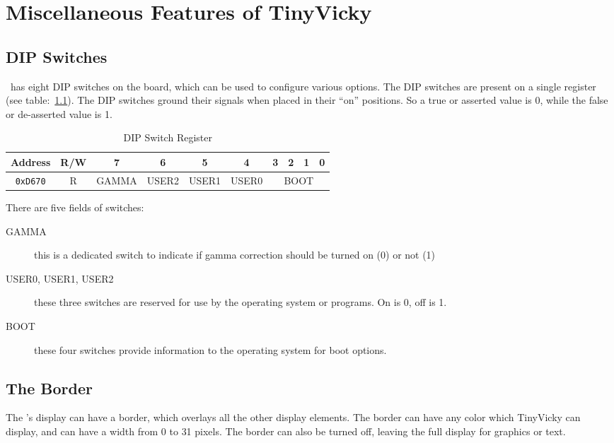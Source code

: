 \chapter{Miscellaneous Features of TinyVicky}

\section*{DIP Switches}

\jr\ has eight DIP switches on the board, which can be used to configure various options. The DIP switches are present on a single register (see table:~\ref{tab:dip_reg}). The DIP switches ground their signals when placed in their ``on'' positions. So a true or asserted value is 0, while the false or de-asserted value is 1.

\begin{table}[ht]
    \begin{center}
        \begin{tabular}{|c|c|c|c|c|c|c|c|c|c|} \hline
            Address & R/W & 7 & 6 & 5 & 4 & 3 & 2 & 1 & 0 \\\hline\hline
            \verb+0xD670+ & R & GAMMA & USER2 & USER1 & USER0 & \multicolumn{4}{|c|}{BOOT} \\ \hline
        \end{tabular}
    \end{center}
    \caption{DIP Switch Register}
    \label{tab:dip_reg}
\end{table}

There are five fields of switches:
\begin{description}
    \item[GAMMA] this is a dedicated switch to indicate if gamma correction should be turned on (0) or not (1)

    \item[USER0, USER1, USER2] these three switches are reserved for use by the operating system or programs. On is 0, off is 1.

    \item[BOOT] these four switches provide information to the operating system for boot options.
\end{description}

\section*{The Border}

The \jr's display can have a border, which overlays all the other display elements. The border can have any color which TinyVicky can display, and can have a width from 0 to 31 pixels. The border can also be turned off, leaving the full display for graphics or text.


